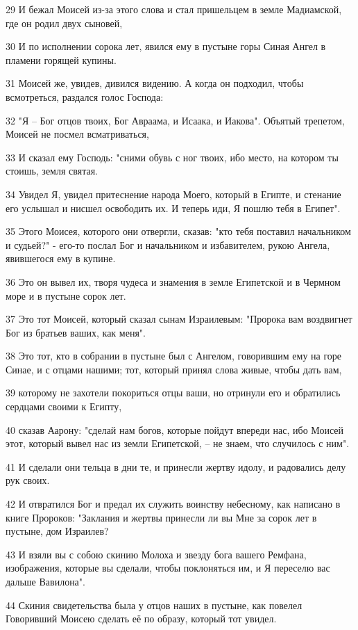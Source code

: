 29 И бежал Моисей из-за этого слова и стал пришельцем в земле Мадиамской, где он родил двух сыновей,

30 И по исполнении сорока лет, явился ему в пустыне горы Синая Ангел в пламени горящей купины.

31 Моисей же, увидев, дивился видению. А когда он подходил, чтобы всмотреться, раздался голос Господа:

32 "Я – Бог отцов твоих, Бог Авраама, и Исаака, и Иакова". Объятый трепетом, Моисей не посмел всматриваться,

33 И сказал ему Господь: "сними обувь с ног твоих, ибо место, на котором ты стоишь, земля святая.

34 Увидел Я, увидел притеснение народа Моего, который в Египте, и стенание его услышал и нисшел освободить их. И теперь иди, Я пошлю тебя в Египет".

35 Этого Моисея, которого они отвергли, сказав: "кто тебя поставил начальником и судьей?" - его-то послал Бог и начальником и избавителем, рукою Ангела, явившегося ему в купине.

36 Это он вывел их, творя чудеса и знамения в земле Египетской и в Чермном море и в пустыне сорок лет.

37 Это тот Моисей, который сказал сынам Израилевым: "Пророка вам воздвигнет Бог из братьев ваших, как меня".

38 Это тот, кто в собрании в пустыне был с Ангелом, говорившим ему на горе Синае, и с отцами нашими; тот, который принял слова живые, чтобы дать вам,

39 которому не захотели покориться отцы ваши, но отринули его и обратились сердцами своими к Египту,

40 сказав Аарону: "сделай нам богов, которые пойдут впереди нас, ибо Моисей этот, который вывел нас из земли Египетской, – не знаем, что случилось с ним".

41 И сделали они тельца в дни те, и принесли жертву идолу, и радовались делу рук своих.

42 И отвратился Бог и предал их служить воинству небесному, как написано в книге Пророков: "Заклания и жертвы принесли ли вы Мне за сорок лет в пустыне, дом Израилев?

43 И взяли вы с собою скинию Молоха и звезду бога вашего Ремфана, изображения, которые вы сделали, чтобы поклоняться им, и Я переселю вас дальше Вавилона".

44 Скиния свидетельства была у отцов наших в пустыне, как повелел Говоривший Моисею сделать её по образу, который тот увидел.

